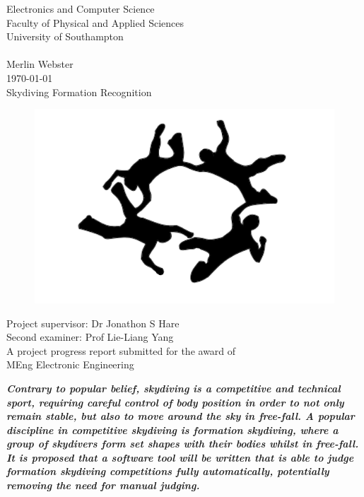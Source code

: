 \documentclass[a4paper, 12pt]{article}
\begin{document}
\begin{titlepage}
\begin{center}{\LARGE
Electronics and Computer Science\\
Faculty of Physical and Applied Sciences\\
University of Southampton\\
\hfill \break
\hfill \break
\hfill \break\\
Merlin Webster\\
\today\\
\hfill \break
Skydiving Formation Recognition\\
\begin{figure}[H]
	\centering
	\includegraphics[width=.7\linewidth]{fs_silhouette.png}
\end{figure}
Project supervisor: Dr Jonathon S Hare\\
Second examiner: Prof Lie-Liang Yang\\
\hfill \break
\hfill \break
A project progress report submitted for the award of\\
MEng Electronic Engineering\\}
\end{center}
\end{titlepage}
%
\renewenvironment{abstract}
  {\small\quotation
  {\bfseries\noindent{\large\abstractname}\par\nobreak\smallskip}}
  {\endquotation}
%
\thispagestyle{empty}
\setcounter{page}{0}
\begin{abstract}\textbf{\emph{
Contrary to popular belief, skydiving is a competitive and technical sport, requiring careful control of body position in order to not only remain stable, but also to move around the sky in free-fall. A popular discipline in competitive skydiving is formation skydiving, where a group of skydivers form set shapes with their bodies whilst in free-fall. It is proposed that a software tool will be written that is able to judge formation skydiving competitions fully automatically, potentially removing the need for manual judging.
}}\end{abstract}
\clearpage
%
\thispagestyle{empty}
\setcounter{page}{0}
\tableofcontents
\clearpage
\thispagestyle{empty}
\setcounter{page}{0}
\listoffigures 
\clearpage
\end{document}
